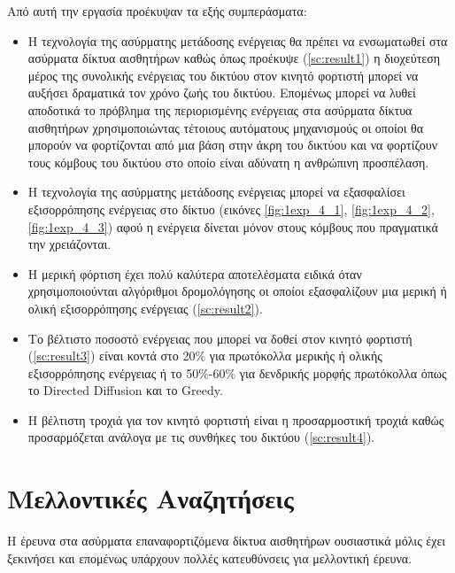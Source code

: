Από αυτή την εργασία προέκυψαν τα εξής συμπεράσματα:
\begin{itemize}
\item Η τεχνολογία της ασύρματης μετάδοσης ενέργειας θα πρέπει να ενσωματωθεί στα ασύρματα δίκτυα αισθητήρων καθώς όπως προέκυψε (\ref{sc:result1}) η διοχεύτεση
μέρος της συνολικής ενέργειας του δικτύου στον κινητό φορτιστή μπορεί να αυξήσει δραματικά τον χρόνο ζωής του δικτύου. Επομένως μπορεί να λυθεί αποδοτικά το πρόβλημα
της περιορισμένης ενέργειας στα ασύρματα δίκτυα αισθητήρων χρησιμοποιώντας τέτοιους αυτόματους μηχανισμούς οι οποίοι θα μπορούν να φορτίζονται από μια βάση στην άκρη
του δικτύου και να φορτίζουν τους κόμβους του δικτύου στο οποίο είναι αδύνατη η ανθρώπινη προσπέλαση.
\item Η τεχνολογία της ασύρματης μετάδοσης ενέργειας μπορεί να εξασφαλίσει εξισορρόπησης ενέργειας στο δίκτυο (εικόνες \ref{fig:1exp_4_1}, \ref{fig:1exp_4_2},
\ref{fig:1exp_4_3}) αφού η ενέργεια δίνεται μόνον στους κόμβους που πραγματικά την χρειάζονται.
\item Η μερική φόρτιση έχει πολύ καλύτερα αποτελέσματα ειδικά όταν χρησιμοποιούνται αλγόριθμοι δρομολόγησης οι οποίοι εξασφαλίζουν μια μερική ή ολική εξισορρόπησης
ενέργειας (\ref{sc:result2}).
\item Το βέλτιστο ποσοστό ενέργειας που μπορεί να δοθεί στον κινητό φορτιστή (\ref{sc:result3}) είναι κοντά στο 20\% για πρωτόκολλα μερικής ή ολικής εξισορρόπησης
ενέργειας ή το 50\%-60\% για δενδρικής μορφής πρωτόκολλα όπως το Directed Diffusion \cite{directed_diffusion} και το Greedy\cite{greedy_protocol}.
\item H βέλτιστη τροχιά για τον κινητό φορτιστή είναι η προσαρμοστική τροχιά καθώς προσαρμόζεται ανάλογα με τις συνθήκες του δικτύου (\ref{sc:result4}).
\end{itemize}

\section{Μελλοντικές Αναζητήσεις}
Η έρευνα στα ασύρματα επαναφορτιζόμενα δίκτυα αισθητήρων ουσιαστικά μόλις έχει ξεκινήσει και επομένως υπάρχουν πολλές κατευθύνσεις για μελλοντική έρευνα.

